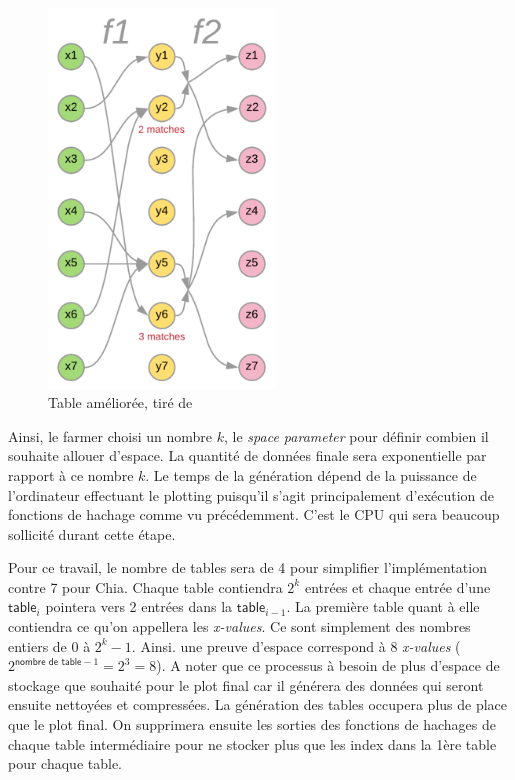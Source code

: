 \documentclass[../tb_report.tex]{subfiles}
\begin{document}
\begin{figure}[H]
  \centering
  \includegraphics[width=6cm]{images/pospace_2.png}
  \caption{Table améliorée, tiré de \cite{chia:construction}}
\end{figure}

Ainsi, le farmer choisi un nombre $k$, le \emph{space parameter} pour définir combien il souhaite allouer d'espace. La quantité de données finale sera exponentielle par rapport à ce nombre $k$. Le temps de la génération dépend de la puissance de l'ordinateur effectuant le plotting puisqu'il s'agit principalement d'exécution de fonctions de hachage comme vu précédemment. C'est le CPU qui sera beaucoup sollicité durant cette étape. 

Pour ce travail, le nombre de tables sera de 4 pour simplifier l'implémentation contre 7 pour Chia. Chaque table contiendra $2^k$ entrées et chaque entrée d'une $\textsf{table}_i$ pointera vers 2 entrées dans la $\textsf{table}_{i-1}$. La première table quant à elle contiendra ce qu'on appellera les \emph{x-values}. Ce sont simplement des nombres entiers de $0$ à $2^k-1$. Ainsi. une preuve d'espace correspond à 8 \emph{x-values} ($2^{\textsf{nombre de table} - 1} = 2^3 = 8$). A noter que ce processus à besoin de plus d'espace de stockage que souhaité pour le plot final car il générera des données qui seront ensuite nettoyées et compressées. La génération des tables occupera plus de place que le plot final. On supprimera ensuite les sorties des fonctions de hachages de chaque table intermédiaire pour ne stocker plus que les index dans la 1ère table pour chaque table.
\end{document}
